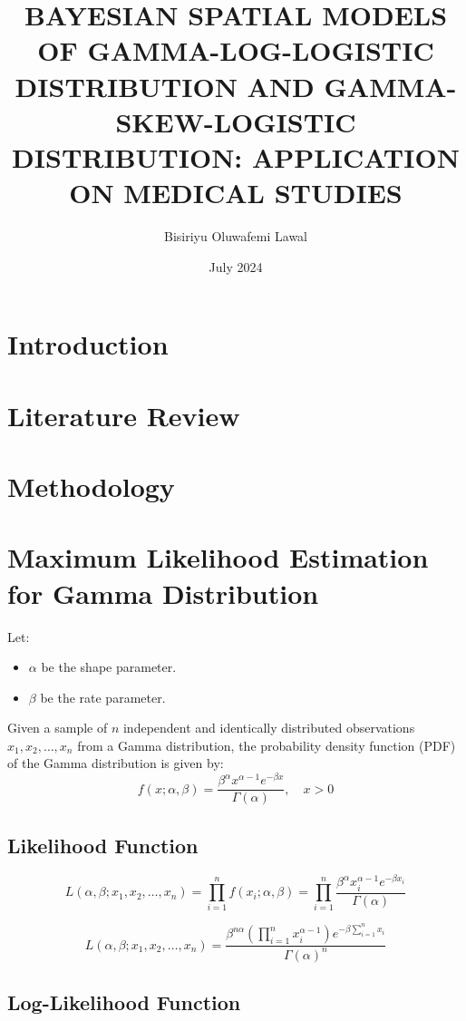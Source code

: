 \documentclass{article}
\title{BAYESIAN SPATIAL MODELS OF GAMMA-LOG-LOGISTIC DISTRIBUTION AND GAMMA-SKEW-LOGISTIC DISTRIBUTION: APPLICATION ON MEDICAL 
 STUDIES}
\author{Bisiriyu Oluwafemi Lawal}
\date{July 2024}
\begin{document}
\maketitle

\section{Introduction}


\section{Literature Review}


\section{Methodology}

\section*{Maximum Likelihood Estimation for Gamma Distribution}

Let:
\begin{itemize}
    \item $\alpha$ be the shape parameter.
    \item $\beta$ be the rate parameter.
\end{itemize}

Given a sample of $n$ independent and identically distributed observations $x_1, x_2, \ldots, x_n$ from a Gamma distribution, the probability density function (PDF) of the Gamma distribution is given by:
\[
f(x; \alpha, \beta) = \frac{\beta^\alpha x^{\alpha-1} e^{-\beta x}}{\Gamma(\alpha)}, \quad x > 0
\]

\subsection*{Likelihood Function}

\[
L(\alpha, \beta; x_1, x_2, \ldots, x_n) = \prod_{i=1}^{n} f(x_i; \alpha, \beta) = \prod_{i=1}^{n} \frac{\beta^\alpha x_i^{\alpha-1} e^{-\beta x_i}}{\Gamma(\alpha)}
\]

\[
L(\alpha, \beta; x_1, x_2, \ldots, x_n) = \frac{\beta^{n\alpha} \left( \prod_{i=1}^{n} x_i^{\alpha-1} \right) e^{-\beta \sum_{i=1}^{n} x_i}}{\Gamma(\alpha)^n}
\]

\subsection*{Log-Likelihood Function}
\end{document}

